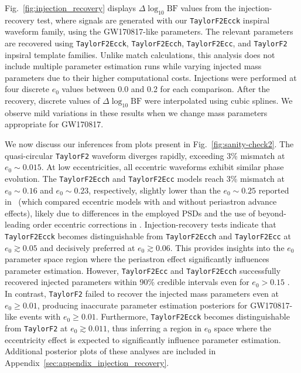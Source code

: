 \documentclass[aps,prd,twocolumn,superscriptaddress,groupedaddress,nofootinbib,showpacs,eqsecnum,useAms]{revtex4-2}
\begin{document}
Fig.~\ref{fig:injection_recovery} displays $\Delta\log_{10}\text{BF}$ values from the injection-recovery test, where signals are generated with our \texttt{TaylorF2Ecck} inspiral waveform family, using the GW170817-like parameters.
The relevant parameters 
are recovered using \texttt{TaylorF2Ecck}, \texttt{TaylorF2Ecch}, \texttt{TaylorF2Ecc}, and \texttt{TaylorF2} inpsiral template families. Unlike match calculations, this analysis does not include multiple parameter estimation runs while varying injected mass parameters due to their higher computational costs. %
Injections were performed at four discrete $e_0$ values between 0.0 and 0.2 for each comparison. After the recovery, discrete values of $\Delta\log_{10}\text{BF}$ were interpolated using cubic splines. 
We observe mild variations in these results when we change mass parameters appropriate for GW170817. 

We now discuss our inferences from plots present in Fig.~\ref{fig:sanity-check2}.
The quasi-circular \texttt{TaylorF2} waveform diverges rapidly, exceeding 3\% mismatch at $e_0 \sim 0.015$. At low eccentricities, all eccentric waveforms exhibit similar phase evolution. The \texttt{TaylorF2Ecch} and \texttt{TaylorF2Ecc} models reach 3\% mismatch at $e_0 \sim 0.16$ and $e_0 \sim 0.23$, respectively, slightly lower than the $e_0 \sim 0.25$ reported in~\cite{TGHH} (which compared eccentric models with and without periastron advance effects), likely due to differences in the employed PSDs and 
the use of beyond-leading order eccentric corrections in \cite{TGHH}.
Injection-recovery tests indicate that \texttt{TaylorF2Ecck} becomes distinguishable from \texttt{TaylorF2Ecch} and \texttt{TaylorF2Ecc} at $e_0 \gtrsim 0.05$ and decisively preferred at $e_0 \gtrsim 0.06$. This provides insights into the $e_0$ parameter space region where the periastron effect significantly influences parameter estimation.
However, \texttt{TaylorF2Ecc} and \texttt{TaylorF2Ecch} successfully recovered injected parameters within 90\% credible intervals even for $e_0 > 0.15$
. In contrast, \texttt{TaylorF2} failed to recover the injected mass parameters even at $e_0 \geq 0.01$, producing inaccurate parameter estimation posteriors for GW170817-like events with $e_0 \geq 0.01$. 
Furthermore, \texttt{TaylorF2Ecck} becomes distinguishable from \texttt{TaylorF2} at $e_0 \gtrsim 0.011$, thus inferring a region in $e_0$ space where the eccentricity effect is expected to significantly influence parameter estimation.
Additional posterior plots of these analyses are included in Appendix~\ref{sec:appendix_injection_recovery}.
\end{document}
